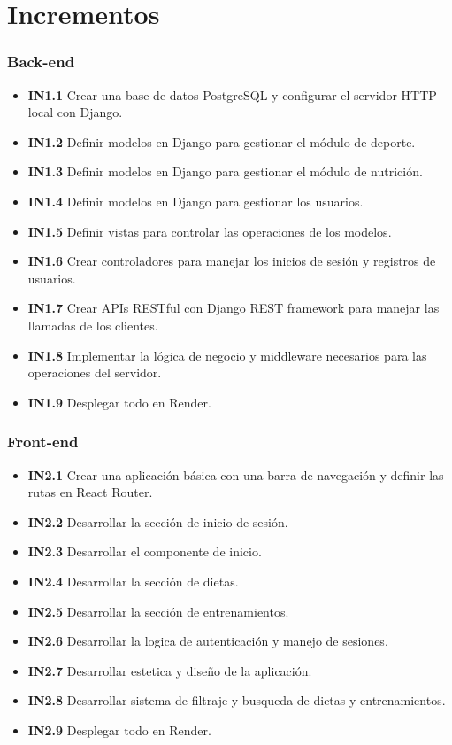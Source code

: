 \section{Incrementos\label{CAP:INCREMENTOS}}

\subsubsection{Back-end}
\begin{itemize}
    \item \textbf{IN1.1} Crear una base de datos PostgreSQL y configurar el servidor HTTP local con Django.
    \item \textbf{IN1.2} Definir modelos en Django para gestionar el módulo de deporte.
    \item \textbf{IN1.3} Definir modelos en Django para gestionar el módulo de nutrición.
    \item \textbf{IN1.4} Definir modelos en Django para gestionar los usuarios.
    \item \textbf{IN1.5} Definir vistas para controlar las operaciones de los modelos.
    \item \textbf{IN1.6} Crear controladores para manejar los inicios de sesión y registros de usuarios.
    \item \textbf{IN1.7} Crear APIs RESTful con Django REST framework para manejar las llamadas de los clientes.
    \item \textbf{IN1.8} Implementar la lógica de negocio y middleware necesarios para las operaciones del servidor.
    \item \textbf{IN1.9} Desplegar todo en Render.
\end{itemize}

\subsubsection{Front-end}
\begin{itemize}
    \item \textbf{IN2.1} Crear una aplicación básica con una barra de navegación y definir las rutas en React Router.
    \item \textbf{IN2.2} Desarrollar la sección de inicio de sesión.
    \item \textbf{IN2.3} Desarrollar el componente de inicio.
    \item \textbf{IN2.4} Desarrollar la sección de dietas.
    \item \textbf{IN2.5} Desarrollar la sección de entrenamientos.
    \item \textbf{IN2.6} Desarrollar la logica de autenticación y manejo de sesiones.
    \item \textbf{IN2.7} Desarrollar estetica y diseño de la aplicación.
    \item \textbf{IN2.8} Desarrollar sistema de filtraje y busqueda de dietas y entrenamientos.
    \item \textbf{IN2.9} Desplegar todo en Render.
\end{itemize}

